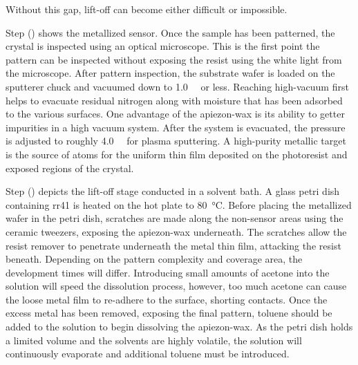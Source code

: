 \documentclass[../../main.tex]{subfiles}
\begin{document}
    Without this gap, lift-off can become either difficult or impossible.
    \par%
    Step () shows the metallized sensor.
    Once the sample has been patterned, the crystal is inspected using an optical microscope.
    This is the first point the pattern can be inspected without exposing the resist using the white light from the microscope.
    After pattern inspection, the substrate wafer is loaded on the \gls{sputterer} chuck and vacuumed down to \SI{1.0}{\micro\torr} or less.
    Reaching high-vacuum first helps to evacuate residual nitrogen along with moisture that has been adsorbed to the various surfaces.
    One advantage of the \gls{apiezon-wax} is its ability to getter impurities in a high vacuum system.
    After the system is evacuated, the pressure is adjusted to roughly \SI{4.0}{\milli\torr} for plasma sputtering.
    A high-purity metallic target is the source of atoms for the uniform thin film deposited on the photoresist and exposed regions of the crystal.
    \par%
    Step () depicts the lift-off stage conducted in a solvent bath.
    A glass petri dish containing \gls{rr41} is heated on the hot plate to \SI{80}{\celsius}.
    Before placing the metallized wafer in the petri dish, scratches are made along the non-sensor areas using the ceramic tweezers, exposing the \gls{apiezon-wax} underneath.    
    The scratches allow the resist remover to penetrate underneath the metal thin film, attacking the resist beneath.
    Depending on the pattern complexity and coverage area, the development times will differ.
    Introducing small amounts of \gls{acetone} into the solution will speed the dissolution process, however, too much \gls{acetone} can cause the loose metal film to re-adhere to the surface, shorting contacts.
    Once the excess metal has been removed, exposing the final pattern, \gls{toluene} should be added to the solution to begin dissolving the \gls{apiezon-wax}.
    As the petri dish holds a limited volume and the solvents are highly volatile, the solution will continuously evaporate and additional toluene must be introduced.
\end{document}
